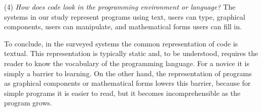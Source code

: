 (4) \textit{How does code look in the programming environment or language?} The systems in our study represent programs using text, users can type, graphical components, users can manipulate, and mathematical forms users can fill in.

To conclude, in the surveyed systems the common representation of code is textual. This representation is typically static and, to be understood, requires the reader to know the vocabulary of the programming language. For a novice it is simply a barrier to learning. On the other hand, the representation of programs as graphical components or mathematical forms lowers this barrier, because for simple programs it is easier to read, but it becomes incomprehensible as the program grows.